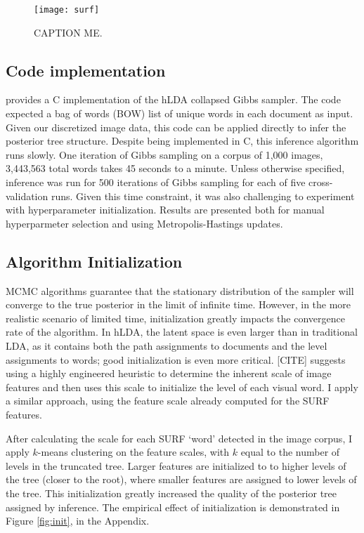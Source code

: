 \documentclass{article}
\begin{document}
\begin{figure}[h]
\centering
\texttt{[image: surf]}
\caption{CAPTION ME.}
    \label{fig:surf}
\end{figure}

\subsection{Code implementation}
\cite{Blei2010} provides a C implementation of the hLDA collapsed Gibbs sampler. The code expected a bag of words (BOW) list of unique words in each document as input. Given our discretized image data, this code can be applied directly to infer the posterior tree structure. Despite being implemented in C, this inference algorithm runs slowly. One iteration of Gibbs sampling on a corpus of 1,000 images, 3,443,563 total words takes 45 seconds to a minute. Unless otherwise specified, inference was run for 500 iterations of Gibbs sampling for each of five cross-validation runs. Given this time constraint, it was also challenging to experiment with hyperparameter initialization. Results are presented both for manual hyperparmeter selection and using Metropolis-Hastings updates.

\subsection{Algorithm Initialization}
\label{sec:init}
MCMC algorithms guarantee that the stationary distribution of the sampler will converge to the true posterior in the limit of infinite time. However, in the more realistic scenario of limited time, initialization greatly impacts the convergence rate of the algorithm.  In hLDA, the latent space is even larger than in traditional LDA, as it contains both the path assignments to documents and the level assignments to words; good initialization is even more critical. [CITE] suggests using a highly engineered heuristic to determine the inherent scale of image features and then uses this scale to initialize the level of each visual word. I apply a similar approach, using the feature scale already computed for the SURF features.

After calculating the scale for each SURF `word' detected in the image corpus, I apply $k$-means clustering on the feature scales, with $k$ equal to the number of levels in the truncated tree. Larger features are initialized to to higher levels of the tree (closer to the root), where smaller features are assigned to lower levels of the tree. This initialization greatly increased the quality of the posterior tree assigned by inference. The empirical effect of initialization is demonstrated in Figure \ref{fig:init}, in the Appendix.
\end{document}
